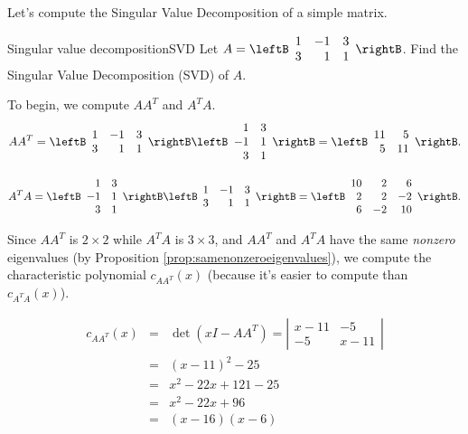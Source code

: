 Let's compute the Singular Value Decomposition of a simple matrix.

\begin{example}{Singular value decomposition}{SVD}
Let 
$A=\leftB\begin{array}{rrr} 1 & -1 & 3 \\ 3 & 1 & 1 \end{array}\rightB$.
Find the Singular Value Decomposition (SVD) of $A$.
\end{example}

\begin{solution}
To begin, we compute $AA^T$ and $A^TA$.
\[ AA^T = \leftB\begin{array}{rrr} 1 & -1 & 3 \\ 3 & 1 & 1 \end{array}\rightB
\leftB\begin{array}{rr} 1 & 3 \\ -1 & 1 \\ 3 & 1  \end{array}\rightB
= \leftB\begin{array}{rr} 11 & 5 \\ 5 & 11  \end{array}\rightB.\]

\[ A^TA = \leftB\begin{array}{rr} 1 & 3 \\ -1 & 1 \\ 3 & 1  \end{array}\rightB
\leftB\begin{array}{rrr} 1 & -1 & 3 \\ 3 & 1 & 1 \end{array}\rightB
= \leftB\begin{array}{rrr} 10 & 2 & 6 \\ 2 & 2 & -2\\
6 & -2 & 10 \end{array}\rightB.\]

Since $AA^T$ is $2\times 2$ while $A^T A$ is $3\times 3$, and $AA^T$
and $A^TA$ have the same {\em nonzero} eigenvalues (by Proposition
\ref{prop:samenonzeroeigenvalues}), we compute the characteristic polynomial  $c_{AA^T}(x)$ (because it's
easier to compute than $c_{A^TA}(x)$).

\begin{eqnarray*}
c_{AA^T}(x)& = &\det(xI-AA^T)= \left|\begin{array}{cc}
x-11 & -5 \\ -5 & x-11 \end{array}\right|\\
& = &(x-11)^2 - 25 \\
& = & x^2-22x+121-25\\
& = & x^2-22x+96\\
& = & (x-16)(x-6)
\end{eqnarray*}


\end{solution}

